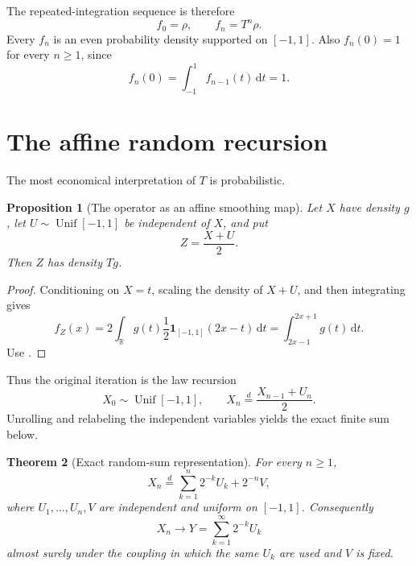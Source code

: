 \documentclass[11pt,oneside]{article}
\newtheorem{theorem}{Theorem}[section]
\newtheorem{proposition}[theorem]{Proposition}
\theoremstyle{definition}
\theoremstyle{remark}
\newcommand{\R}{\mathbb R}
\newcommand{\dd}{\,\mathrm d}
\newcommand{\Unif}{\operatorname{Unif}}
\begin{document}
The repeated-integration sequence is therefore
\begin{equation}
 f_0=\rho,\qquad f_n=T^n\rho.                               \label{eq:fn-def}
\end{equation}
Every $f_n$ is an even probability density supported on $[-1,1]$.  Also
$f_n(0)=1$ for every $n\ge1$, since
\begin{equation}
 f_n(0)=\int_{-1}^{1}f_{n-1}(t)\dd t=1.                    \label{eq:center-one}
\end{equation}

\section{The affine random recursion}
\label{sec:probability}

The most economical interpretation of $T$ is probabilistic.

\begin{proposition}[The operator as an affine smoothing map]
\label{prop:affine-map}
Let $X$ have density $g$, let $U\sim\Unif[-1,1]$ be independent of $X$, and put
\begin{equation}
 Z=\frac{X+U}{2}.                                           \label{eq:affine-Z}
\end{equation}
Then $Z$ has density $Tg$.
\end{proposition}

\begin{proof}
Conditioning on $X=t$, scaling the density of $X+U$, and then integrating gives
\[
 f_Z(x)=2\int_{\R}g(t)\frac12\mathbf 1_{[-1,1]}(2x-t)\dd t
       =\int_{2x-1}^{2x+1}g(t)\dd t.
\]
Use .
\end{proof}

Thus the original iteration is the law recursion
\begin{equation}
 X_0\sim\Unif[-1,1],\qquad
 X_n\overset d=\frac{X_{n-1}+U_n}{2}.                      \label{eq:Markov-recursion}
\end{equation}
Unrolling and relabeling the independent variables yields the exact finite sum below.

\begin{theorem}[Exact random-sum representation]
\label{thm:random-sum}
For every $n\ge1$,
\begin{equation}
 X_n\overset d=\sum_{k=1}^{n}2^{-k}U_k+2^{-n}V,            \label{eq:Xn-sum}
\end{equation}
where $U_1,\ldots,U_n,V$ are independent and uniform on $[-1,1]$.
Consequently
\begin{equation}
 X_n\longrightarrow Y=\sum_{k=1}^{\infty}2^{-k}U_k        \label{eq:Xn-coupling}
\end{equation}
almost surely under the coupling in which the same $U_k$ are used and $V$ is fixed.
\end{theorem}
\end{document}
